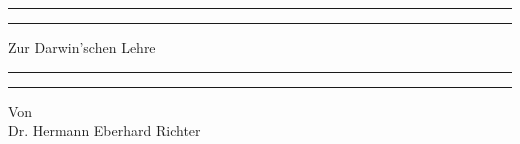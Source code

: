 \documentclass[a4paper, 11pt, oneside, english]{article}
\begin{document}
\renewcommand{\thefigure}{\frakfamily{\arabic{figure}}}
\renewcommand\thefootnote{\frakfamily{\arabic{footnote}}}
\let\oldfootnote\footnote
    \renewcommand{\footnote}[1]{\oldfootnote{\frakfamily\large#1}}
\begin{titlepage} %
	\centering %
	\scshape %

	
	\rule{\textwidth}{1.6pt}\vspace*{-\baselineskip}\vspace*{2pt} %
	\rule{\textwidth}{0.4pt} %
	
	\vspace{0.75\baselineskip} %

        {\Huge Zur Darwin'schen Lehre \\} %
	
	\vspace{0.75\baselineskip} %
	
	\rule{\textwidth}{0.4pt}\vspace*{-\baselineskip}\vspace{3.2pt} %
	\rule{\textwidth}{1.6pt} %
	
	\vspace{1\baselineskip} %
	
	
	{Von \\\Large Dr. Hermann Eberhard Richter\\} %
	
	\vspace*{1\baselineskip} %
	
	
		
		

\end{titlepage}
\end{document}

